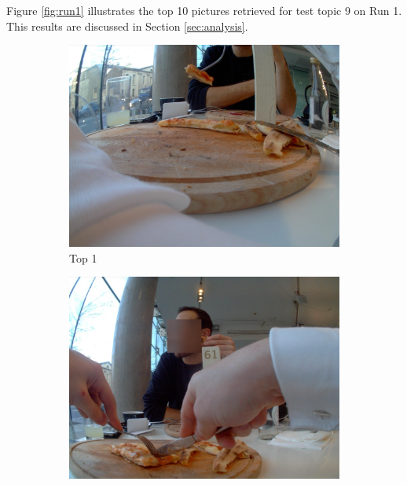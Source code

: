 Figure \ref{fig:run1} illustrates the top 10 pictures retrieved for test topic 9 on Run 1. This results are discussed in Section \ref{sec:analysis}.\\

\begin{figure}[H]
  \centering
  \captionsetup{justification=centering}

  \begin{subfigure}{0.32\textwidth}
    \includegraphics[width=\textwidth]{Sections/7Results/images/top1.jpg} 
    \caption{Top 1}
  \end{subfigure}
  \begin{subfigure}{0.32\textwidth}
    \includegraphics[width=\textwidth]{Sections/7Results/images/top2.jpg}\hfill

\end{subfigure}
\end{figure}
